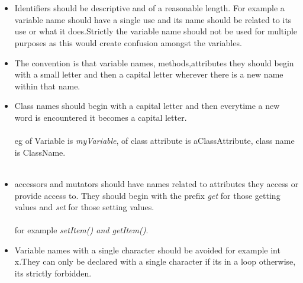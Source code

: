 \documentclass[12pt]{article}
\begin{document}
	\section{\bfseries\selectfont{Identifiers}}
	\begin{itemize}
	\item Identifiers should be descriptive and of a reasonable length. For example a variable name should have a single use and its name should be related to its use or what it does.Strictly the variable 		name should not be used for multiple purposes as this would create 		confusion amongst the variables.
	\item The convention is that variable names, methods,attributes they should begin with a small letter and then a capital letter wherever there is a new name within that name.
	\item Class names should begin with a capital letter and then 	everytime a new word is encountered it becomes a capital letter.
	\\\\
	eg of Variable is {\it myVariable}, of class attribute is aClassAttribute, class name is ClassName. \\\\
	\item accessors and mutators should have names related to attributes they access or provide access to. They should begin with the prefix {\it get} for those getting values and {\it set} for those setting values.\\\\
	for example {\it setItem() and getItem()}.
	\item Variable names with a  single character should be avoided for example int x.They can only be declared with a single character if its in a loop otherwise, its strictly forbidden.
	\end{itemize}
	
\end{document}
